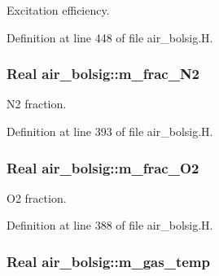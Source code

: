 Excitation efficiency. 



Definition at line 448 of file air\+\_\+bolsig.\+H.

\subsubsection[{\texorpdfstring{m\+\_\+frac\+\_\+\+N2}{m_frac_N2}}]{\setlength{\rightskip}{0pt plus 5cm}Real air\+\_\+bolsig\+::m\+\_\+frac\+\_\+\+N2\hspace{0.3cm}{\ttfamily [protected]}}\hypertarget{classair__bolsig_a45ba35b6821761397f767836548b89ad}{}\label{classair__bolsig_a45ba35b6821761397f767836548b89ad}


N2 fraction. 



Definition at line 393 of file air\+\_\+bolsig.\+H.

\subsubsection[{\texorpdfstring{m\+\_\+frac\+\_\+\+O2}{m_frac_O2}}]{\setlength{\rightskip}{0pt plus 5cm}Real air\+\_\+bolsig\+::m\+\_\+frac\+\_\+\+O2\hspace{0.3cm}{\ttfamily [protected]}}\hypertarget{classair__bolsig_a6b013ecc6ffcaf4fe641f7ce17ddd44d}{}\label{classair__bolsig_a6b013ecc6ffcaf4fe641f7ce17ddd44d}


O2 fraction. 



Definition at line 388 of file air\+\_\+bolsig.\+H.

\subsubsection[{\texorpdfstring{m\+\_\+gas\+\_\+temp}{m_gas_temp}}]{\setlength{\rightskip}{0pt plus 5cm}Real air\+\_\+bolsig\+::m\+\_\+gas\+\_\+temp\hspace{0.3cm}{\ttfamily [protected]}}\hypertarget{classair__bolsig_abf9206e5a2799dc3e20d143e51114ca8}{}\label{classair__bolsig_abf9206e5a2799dc3e20d143e51114ca8}


